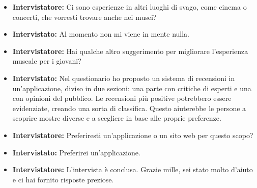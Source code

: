 \documentclass{article}
\begin{document}
\begin{itemize}
    \item \textbf{Intervistatore:} Ci sono esperienze in altri luoghi di svago, come cinema o concerti, che vorresti trovare anche nei musei?

    \item \textbf{Intervistato:} Al momento non mi viene in mente nulla.

    \item \textbf{Intervistatore:} Hai qualche altro suggerimento per migliorare l’esperienza museale per i giovani?

    \item \textbf{Intervistato:} Nel questionario ho proposto un sistema di recensioni in un’applicazione, diviso in due sezioni: una parte con critiche di esperti e una con opinioni del pubblico. Le recensioni più positive potrebbero essere evidenziate, creando una sorta di classifica. Questo aiuterebbe le persone a scoprire mostre diverse e a scegliere in base alle proprie preferenze.

    \item \textbf{Intervistatore:} Preferiresti un’applicazione o un sito web per questo scopo?

    \item \textbf{Intervistato:} Preferirei un’applicazione.

    \item \textbf{Intervistatore:} L’intervista è conclusa. Grazie mille, sei stato molto d’aiuto e ci hai fornito risposte preziose.
\end{itemize}
\end{document}
